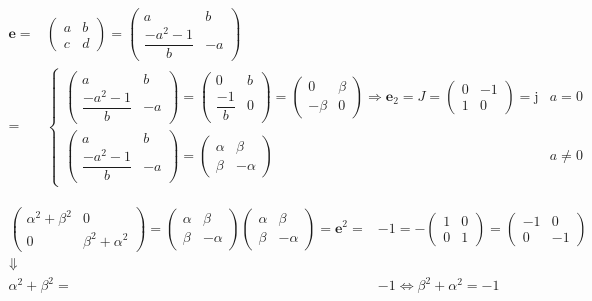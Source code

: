 \documentclass[
]{book}
\theoremstyle{definition}
\theoremstyle{definition}
\theoremstyle{definition}
\theoremstyle{definition}
\theoremstyle{remark}
\begin{document}
\[
\begin{aligned}
\boldsymbol{e}= & \begin{pmatrix}a & b\\
c & d
\end{pmatrix}=\begin{pmatrix}a & b\\
\dfrac{-a^{2}-1}{b} & -a
\end{pmatrix}\\
= & \begin{cases}
\begin{pmatrix}a & b\\
\dfrac{-a^{2}-1}{b} & -a
\end{pmatrix}=\begin{pmatrix}0 & b\\
\dfrac{-1}{b} & 0
\end{pmatrix}=\begin{pmatrix}0 & \beta\\
-\beta & 0
\end{pmatrix}\Rightarrow\boldsymbol{e}_{{\scriptscriptstyle 2}}=J=\begin{pmatrix}0 & -1\\
1 & 0
\end{pmatrix}=\mathrm{j} & a=0\\
\begin{pmatrix}a & b\\
\dfrac{-a^{2}-1}{b} & -a
\end{pmatrix}=\begin{pmatrix}\alpha & \beta\\
\beta & -\alpha
\end{pmatrix} & a\ne0
\end{cases}
\end{aligned}
\]

\[
\begin{aligned}
\begin{pmatrix}\alpha^{2}+\beta^{2} & 0\\
0 & \beta^{2}+\alpha^{2}
\end{pmatrix}=\begin{pmatrix}\alpha & \beta\\
\beta & -\alpha
\end{pmatrix}\begin{pmatrix}\alpha & \beta\\
\beta & -\alpha
\end{pmatrix}=\boldsymbol{e}^{2}= & -1=-\begin{pmatrix}1 & 0\\
0 & 1
\end{pmatrix}=\begin{pmatrix}-1 & 0\\
0 & -1
\end{pmatrix}\\
\Downarrow\\
\alpha^{2}+\beta^{2}= & -1\Leftrightarrow\beta^{2}+\alpha^{2}=-1
\end{aligned}
\]
\end{document}
